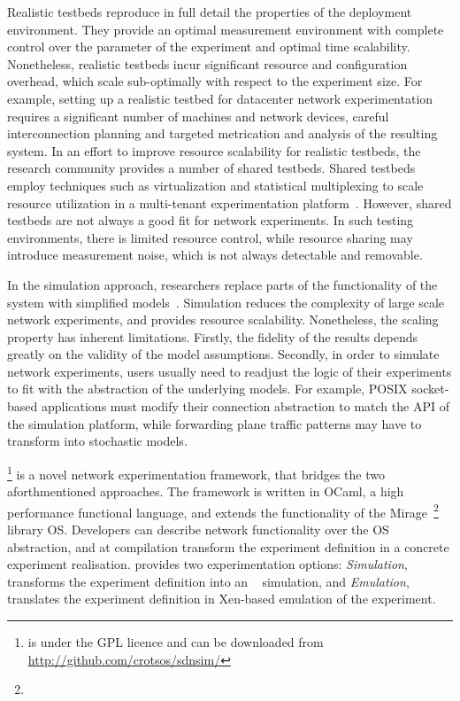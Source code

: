 Realistic testbeds reproduce in full detail the properties of the deployment
environment. They provide an optimal measurement environment with complete
control over the parameter of the experiment and optimal time scalability.
Nonetheless, realistic testbeds incur significant resource and configuration
overhead, which scale sub-optimally with respect to the experiment size.  For
example, setting up a realistic testbed for datacenter network experimentation
requires a significant number of machines and network devices, careful
interconnection planning and targeted metrication and analysis of the resulting
system. In an effort to improve resource scalability for realistic testbeds, the
research community provides a number of shared testbeds. Shared testbeds employ
techniques such as virtualization and statistical multiplexing to scale
resource utilization in a multi-tenant experimentation
platform~\cite{planetlab,emulab}.  However, shared testbeds are not always a
good fit for network experiments. In such testing environments, there is limited
resource control, while resource sharing may introduce measurement noise, which
is not always detectable and removable. 

In the simulation approach, researchers replace parts of the functionality of
the system with simplified models~\cite{Varga2008,issariyakul2012}.  Simulation
reduces the complexity of large scale network experiments, and provides resource
scalability. Nonetheless, the scaling property has inherent limitations.
Firstly, the fidelity of the results depends greatly on the validity of the
model assumptions. Secondly, in order to simulate network experiments, users
usually need to readjust the logic of their experiments to fit with the
abstraction of the underlying models.  For example, POSIX socket-based
applications must modify their connection abstraction to match the API of the
simulation platform, while forwarding plane traffic patterns may have to
transform into stochastic models. 

\sdnsim\footnote{\sdnsim is under the GPL licence and can be downloaded from
  \url{http://github.com/crotsos/sdnsim/}} is a novel network experimentation
framework, that bridges the two aforthmentioned approaches. The framework is
written in OCaml, a high performance functional language, and extends the
functionality of the Mirage~\footnote{\mirageurl} library OS. Developers can
describe network functionality over the \mirage OS abstraction, and
at compilation transform the experiment definition in a concrete experiment
realisation.  \sdnsim provides two experimentation options: \emph{Simulation},
transforms the experiment definition into an ~\cite{Henderson2006}
simulation, and \emph{Emulation}, translates the experiment definition in
Xen-based emulation of the experiment.

